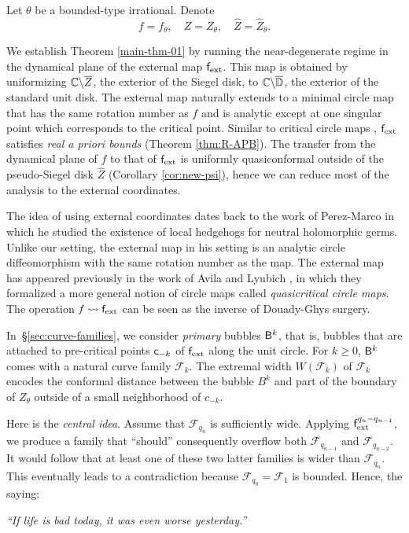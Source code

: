 \documentclass{amsart}
\begin{document}
Let $\theta$ be a bounded-type irrational.
Denote \[f = f_\theta,\quad Z = Z_\theta,\quad \hat{Z} = \hat{Z}_\theta.\] 

We establish Theorem \ref{main-thm-01} by running the near-degenerate regime in the dynamical plane of the external map $\mathsf{f}_{\textnormal{ext}}$. This map is obtained by uniformizing $\mathbb{C} \backslash \overline{Z}$, the exterior of the Siegel disk, to $\mathbb{C} \backslash \overline{\mathbb{D}}$, the exterior of the standard unit disk. 
The external map naturally extends to a minimal circle map that has the same rotation number as $f$ and is analytic except at one singular point which corresponds to the critical point. 
Similar to critical circle maps \cite{H87,Sw87}, $\mathsf{f}_{\textnormal{ext}}$ satisfies \emph{real a priori bounds} (Theorem \ref{thm:R-APB}). 
The transfer from the dynamical plane of $f$ to that of $\mathsf{f}_{\textnormal{ext}}$ is uniformly quasiconformal outside of the pseudo-Siegel disk $\hat{Z}$ (Corollary \ref{cor:new-psi}), hence we can reduce most of the analysis to the external coordinates.

The idea of using external coordinates dates back to the work of Perez-Marco \cite{PM97} in which he studied the existence of local hedgehogs for neutral holomorphic germs. 
Unlike our setting, the external map in his setting is an analytic circle diffeomorphism with the same rotation number as the map. The external map has appeared previously in the work of Avila and Lyubich \cite{AL22}, in which they formalized a more general notion of circle maps called \emph{quasicritical circle maps}.
The operation $f \leadsto \mathsf{f}_{\textnormal{ext}}$ can be seen as the inverse of Douady-Ghys surgery.

In~\S\ref{sec:curve-families}, we consider \emph{primary} bubbles $\mathsf{B}^{k}$, that is, bubbles that are attached to pre-critical points $\mathsf{c}_{-k}$ of $\mathsf{f}_{\textnormal{ext}}$ along the unit circle. 
For $k \geq 0$, $\mathsf{B}^{k}$ comes with a natural curve family $\mathcal{F}_{k}$. 
The extremal width $W(\mathcal{F}_{k})$ of $\mathcal{F}_{k}$ encodes the conformal distance between the bubble $B^{k}$ and part of the boundary of $Z_\theta$ outside of a small neighborhood of $c_{-k}$. 

Here is the \emph{central idea}. Assume that $\mathcal{F}_{q_n}$ is sufficiently wide. Applying $\mathsf{f}_{\textnormal{ext}}^{q_n-q_{n-1}}$, we produce a family that ``should'' consequently overflow both $\mathcal{F}_{q_{n-1}}$ and $\mathcal{F}_{q_{n-2}}$. It would follow that at least one of these two latter families is wider than $\mathcal{F}_{q_n}$. This eventually leads to a contradiction because $\mathcal{F}_{q_{0}}=\mathcal{F}_{1}$ is bounded. Hence, the saying:
\begin{center}
    \textit{``If life is bad today, it was even worse yesterday.''}
\end{center} 
\end{document}
